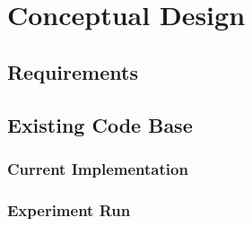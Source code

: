 \chapter{Conceptual Design}
\label{ch:conceptualDesign}

\section{Requirements}
\label{ch:conceptualDesign-requirements}




\section{Existing Code Base}
\label{ch:conceptualDesign-existingCodeBase}

\subsection{Current Implementation}
\label{ch:conceptualDesign-existingCodeBase-currentImplementation}

\subsection{Experiment Run}
\label{ch:conceptualDesign-existingCodeBase-experimentRun}

